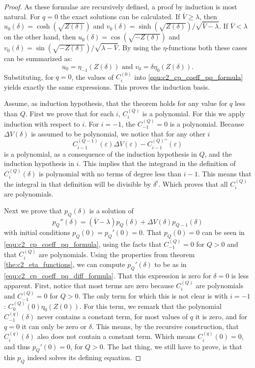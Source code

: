 \begin{proof}
As these formulae are recursively defined, a proof by induction is most natural. For $q=0$ the exact solutions can be calculated. If $\bar{V} \geq \lambda$, then $u_0(\delta) = \cosh(\sqrt{Z(\delta)})$ and $v_0(\delta) = \sinh(\sqrt{Z(\delta)})/\sqrt{\bar{V} - \lambda}$. If $\bar{V} < \lambda$ on the other hand, then $u_0(\delta) = \cos(\sqrt{-Z(\delta)})$ and $v_0(\delta) = \sin(\sqrt{-Z(\delta)})/\sqrt{\lambda - \bar{V}}$. By using the $\eta$-functions both these cases can be summarized as:
$$ u_0 = \eta_{-1}(Z(\delta)) \text{ and } v_0 = \delta\eta_{0}(Z(\delta))\text{.}$$
Substituting, for $q=0$, the values of $C^{(0)}_i$ into \eqref{equ:c2_cp_coeff_pq_formula} yields exactly the same expressions. This proves the induction basis.

Assume, as induction hypothesis, that the theorem holds for any value for $q$ less than $Q$. First we prove that for each $i$, $C_i^{(Q)}$ is a polynomial. For this we apply induction with respect to $i$. For $i = -1$, the $C^{(Q)}_{-1} =0$ is a polynomial. Because $\Delta V(\delta)$ is assumed to be polynomial, we notice that for any other $i$
$$
    C_{i-1}^{(Q-1)}(\varepsilon) \Delta V(\varepsilon) - C_{i-1}^{(Q)\prime\prime}(\varepsilon)
$$
is a polynomial, as a consequence of the induction hypothesis in $Q$, and the induction hypothesis in $i$. This implies that the integrand in the definition of $C_i^{(Q)}(\delta)$ is polynomial with no terms of degree less than $i-1$. This means that the integral in that definition will be divisible by $\delta^i$. Which proves that all $C_{i}^{(Q)}$ are polynomials.

Next we prove that $p_Q(\delta)$ is a solution of
$$
    p_Q''(\delta)  = (\bar{V} - \lambda) p_Q(\delta) + \Delta V(\delta) p_{Q-1}(\delta)
$$
with initial conditions $p_Q(0) = p_Q'(0) = 0$. That $p_Q(0) = 0$ can be seen in \eqref{equ:c2_cp_coeff_pq_formula}, using the facts that $C^{(Q)}_{-1} = 0$ for $Q > 0$ and that $C_i^{(Q)}$ are polynomials. Using the properties from theorem \ref{the:c2_eta_functions}, we can compute $p_Q'(\delta)$ to be as in \eqref{equ:c2_cp_coeff_pq_diff_formula}. That this expression is zero for $\delta = 0$ is less apparent. First, notice that most terms are zero because $C_i^{(Q)}$ are polynomials and $C^{(Q)}_{-1} = 0$ for $Q > 0$. The only term for which this is not clear is with $i = -1$: $C_0^{(Q)}(0)\eta_{0}(Z(0))$. For this term, we remark that the polynomial $C^{(q)}_{-1}(\delta)$ never contains a constant term, for most values of $q$ it is zero, and for $q=0$ it can only be zero or $\delta$. This means, by the recursive construction, that $C_{i}^{(q)}(\delta)$ also does not contain a constant term. Which means $C_{i}^{(q)}(0) = 0$, and thus $p_Q'(0) = 0$, for $Q > 0$. The last thing, we still have to prove, is that this $p_Q$ indeed solves its defining equation.


\end{proof}
